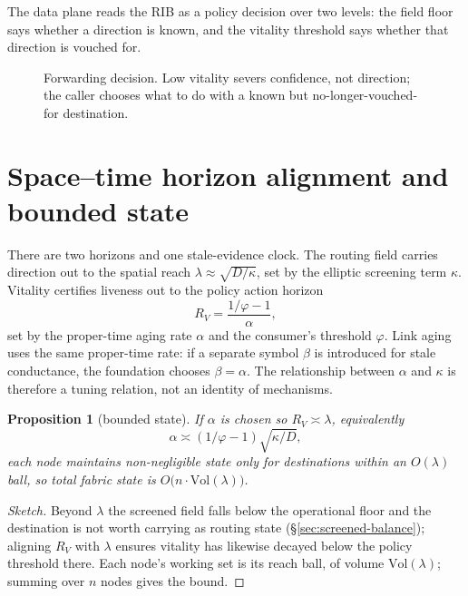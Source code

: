 \documentclass[11pt]{article}
\theoremstyle{plain}
\newtheorem{proposition}[theorem]{Proposition}
\numberwithin{equation}{section}
\begin{document}
The data plane reads the RIB as a policy decision over two levels: the field floor says whether a
direction is known, and the vitality threshold says whether that direction is vouched for.

\begin{figure}[t]
\centering

\caption{Forwarding decision.  Low vitality severs confidence, not direction; the caller chooses what to
do with a known but no-longer-vouched-for destination.}
\end{figure}

\section{Space–time horizon alignment and bounded state}\label{sec:spacetime}

There are two horizons and one stale-evidence clock. The routing field carries direction out to the spatial reach $\lambda\approx\sqrt{D/\kappa}$, set by the elliptic screening term $\kappa$. Vitality certifies liveness out to the policy action horizon
\[
R_V=\frac{1/\varphi-1}{\alpha},
\]
set by the proper-time aging rate $\alpha$ and the consumer's threshold $\varphi$. Link aging uses the same proper-time rate: if a separate symbol $\beta$ is introduced for stale conductance, the foundation chooses $\beta=\alpha$. The relationship between $\alpha$ and $\kappa$ is therefore a tuning relation, not an identity of mechanisms.

\begin{proposition}[bounded state]\label{prop:bounded}
If $\alpha$ is chosen so $R_V\asymp\lambda$, equivalently
\begin{equation}\label{eq:alpha-kappa}
\alpha\asymp (1/\varphi-1)\sqrt{\kappa/D},
\end{equation}
each node maintains non-negligible state only for destinations within an $O(\lambda)$ ball, so total fabric state is $O\!\big(n\cdot\mathrm{Vol}(\lambda)\big)$.
\end{proposition}
\begin{proof}[Sketch]
Beyond $\lambda$ the screened field falls below the operational floor and the destination is not worth carrying as routing state (§\ref{sec:screened-balance}); aligning $R_V$ with $\lambda$ ensures vitality has likewise decayed below the policy threshold there. Each node's working set is its reach ball, of volume $\mathrm{Vol}(\lambda)$; summing over $n$ nodes gives the bound.
\end{proof}
\end{document}
